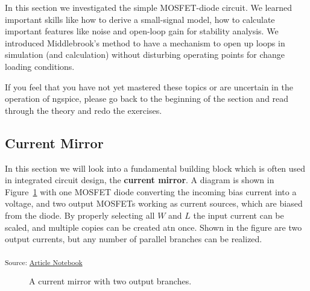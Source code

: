 \documentclass[
  a4paper,
  DIV=11,
  numbers=noendperiod]{scrartcl}
\begin{document}
In this section we investigated the simple MOSFET-diode circuit. We
learned important skills like how to derive a small-signal model, how to
calculate important features like noise and open-loop gain for stability
analysis. We introduced Middlebrook's method to have a mechanism to open
up loops in simulation (and calculation) without disturbing operating
points for change loading conditions.

If you feel that you have not yet mastered these topics or are uncertain
in the operation of ngspice, please go back to the beginning of the
section and read through the theory and redo the exercises.

\subsection{Current Mirror}\label{sec-current-mirror}

In this section we will look into a fundamental building block which is
often used in integrated circuit design, the \textbf{current mirror}. A
diagram is shown in Figure~\ref{fig-current-mirror} with one MOSFET
diode converting the incoming bias current into a voltage, and two
output MOSFETs working as current sources, which are biased from the
diode. By properly selecting all \(W\) and \(L\) the input current can
be scaled, and multiple copies can be created atn once. Shown in the
figure are two output currents, but any number of parallel branches can
be realized.

\textsubscript{Source:
\href{https://iic-jku.github.io/analog-circuit-design/index.qmd.html}{Article
Notebook}}

\begin{figure}[H]


\caption{\label{fig-current-mirror}A current mirror with two output
branches.}

\end{figure}%
\end{document}
